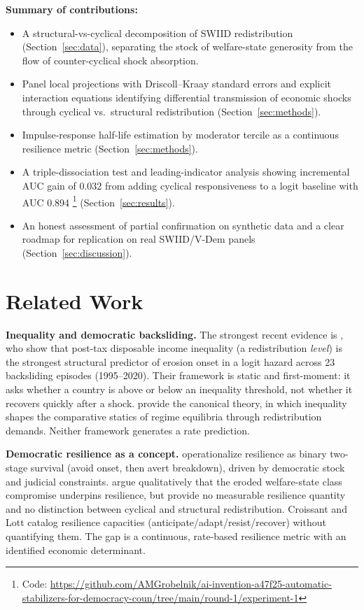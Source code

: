 \documentclass[11pt,letterpaper]{article}
\begin{document}
\textbf{Summary of contributions:}
\begin{itemize}
  \item A structural-vs-cyclical decomposition of SWIID redistribution (Section~\ref{sec:data}), separating the stock of welfare-state generosity from the flow of counter-cyclical shock absorption.
  \item Panel local projections \citep{Jorda2005} with Driscoll--Kraay standard errors and explicit interaction equations identifying differential transmission of economic shocks through cyclical vs.~structural redistribution (Section~\ref{sec:methods}).
  \item Impulse-response half-life estimation by moderator tercile as a continuous resilience metric (Section~\ref{sec:methods}).
  \item A triple-dissociation test and leading-indicator analysis showing incremental AUC gain of 0.032 from adding cyclical responsiveness to a logit baseline with AUC 0.894 \footnote{Code: \url{https://github.com/AMGrobelnik/ai-invention-a47f25-automatic-stabilizers-for-democracy-coun/tree/main/round-1/experiment-1}} (Section~\ref{sec:results}).
  \item An honest assessment of partial confirmation on synthetic data and a clear roadmap for replication on real SWIID/V-Dem panels (Section~\ref{sec:discussion}).
\end{itemize}

\section{Related Work}

\textbf{Inequality and democratic backsliding.} The strongest recent evidence is \citet{Rau2025}, who show that post-tax disposable income inequality (a redistribution \emph{level}) is the strongest structural predictor of erosion onset in a logit hazard across 23 backsliding episodes (1995--2020). Their framework is static and first-moment: it asks whether a country is above or below an inequality threshold, not whether it recovers quickly after a shock. \citet{Acemoglu2006} provide the canonical theory, in which inequality shapes the comparative statics of regime equilibria through redistribution demands. Neither framework generates a rate prediction.

\textbf{Democratic resilience as a concept.} \citet{Boese2021} operationalize resilience as binary two-stage survival (avoid onset, then avert breakdown), driven by democratic stock and judicial constraints. \citet{Riedl2024} argue qualitatively that the eroded welfare-state class compromise underpins resilience, but provide no measurable resilience quantity and no distinction between cyclical and structural redistribution. Croissant and Lott catalog resilience capacities (anticipate/adapt/resist/recover) without quantifying them. The gap is a continuous, rate-based resilience metric with an identified economic determinant.
\end{document}
